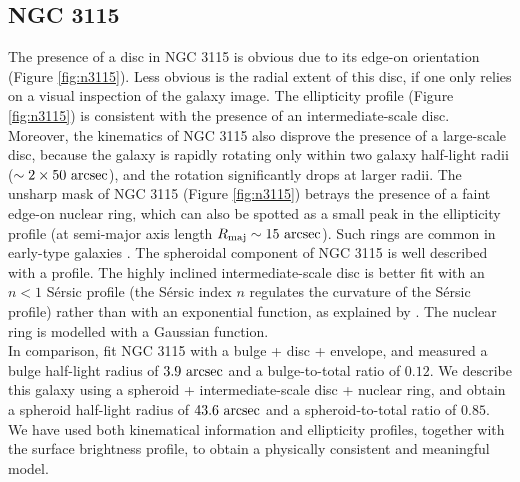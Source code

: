 \documentclass[useAMS,usenatbib,article]{mnras}
\begin{document}
\subsection{NGC 3115}
The presence of a disc in NGC 3115 is obvious due to its edge-on orientation (Figure \ref{fig:n3115}). 
Less obvious is the radial extent of this disc, if one only relies on a visual inspection of the galaxy image. 
The ellipticity profile (Figure \ref{fig:n3115}) is consistent with the presence of an intermediate-scale disc. 
Moreover, the kinematics of NGC 3115 \citep{arnold2011n3115} also disprove the presence of a large-scale disc, 
because the galaxy is rapidly rotating only within two galaxy half-light radii ($\sim 2 \times 50~\rm arcsec$), 
and the rotation significantly drops at larger radii.  
The unsharp mask of NGC 3115 (Figure \ref{fig:n3115}) betrays the presence of a faint edge-on nuclear ring, 
which can also be spotted as a small peak in the ellipticity profile 
(at semi-major axis length $R_{\rm maj} \sim 15~\rm arcsec$). 
Such rings are common in early-type galaxies \citep{michardmarchal1993}.
The spheroidal component of NGC 3115 is well described with a \cite{sersic1963} profile.
The highly inclined intermediate-scale disc is better fit with an $n<1$ S\'ersic profile 
(the S\'ersic index $n$ regulates the curvature of the S\'ersic profile) 
rather than with an exponential function, 
as explained by \cite{pastrav2013a}. 
The nuclear ring is modelled with a Gaussian function. \\
In comparison, \cite{lasker2014data} fit NGC 3115 with a bulge + disc + envelope, 
and measured a bulge half-light radius of $3.9~\rm arcsec$ and a bulge-to-total ratio of $0.12$. 
We describe this galaxy using a spheroid + intermediate-scale disc + nuclear ring, 
and obtain a spheroid half-light radius of $43.6~\rm arcsec$ and a spheroid-to-total ratio of $0.85$. 
We have used both kinematical information and ellipticity profiles, 
together with the surface brightness profile, 
to obtain a physically consistent and meaningful model. 
\end{document}
